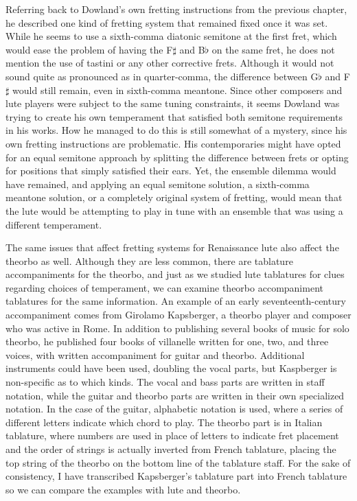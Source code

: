 Referring back to Dowland's own fretting instructions from the previous chapter, he described one kind of fretting
system that remained fixed once it was set. While he seems to use a sixth-comma diatonic semitone at the first fret,
which would ease the problem of having the F$\sharp$ and B$\flat$ on the same fret, he does not mention the use of
tastini or any other corrective frets. Although it would not sound quite as pronounced as in quarter-comma, the
difference between G$\flat$ and F$\sharp$ would still remain, even in sixth-comma meantone. Since other composers and
lute players were subject to the same tuning constraints, it seems Dowland was trying to create his own temperament that
satisfied both semitone requirements in his works. How he managed to do this is still somewhat of a mystery, since his
own fretting instructions are problematic. His contemporaries might have opted for an equal semitone approach by
splitting the difference between frets or opting for positions that simply satisfied their ears. Yet, the ensemble
dilemma would have remained, and applying an equal semitone solution, a sixth-comma meantone solution, or a completely
original system of fretting, would mean that the lute would be attempting to play in tune with an ensemble that was
using a different temperament.

The same issues that affect fretting systems for Renaissance lute also affect the theorbo as well. Although they are
less common, there are tablature accompaniments for the theorbo, and just as we studied lute tablatures for clues
regarding choices of temperament, we can examine theorbo accompaniment tablatures for the same information. An example
of an early seventeenth-century accompaniment comes from Girolamo Kapsberger, a theorbo player and composer who was
active in Rome. In addition to publishing several books of music for solo theorbo, he published four books of villanelle
written for one, two, and three voices, with written accompaniment for guitar and theorbo. Additional instruments could
have been used, doubling the vocal parts, but Kaspberger is non-specific as to which kinds. The vocal and bass parts are
written in staff notation, while the guitar and theorbo parts are written in their own specialized notation. In the case
of the guitar, alphabetic notation is used, where a series of different letters indicate which chord to play. The
theorbo part is in Italian tablature, where numbers are used in place of letters to indicate fret placement and the
order of strings is actually inverted from French tablature, placing the top string of the theorbo on the bottom line of
the tablature staff. For the sake of consistency, I have transcribed Kapsberger's tablature part into French tablature
so we can compare the examples with lute and theorbo.

